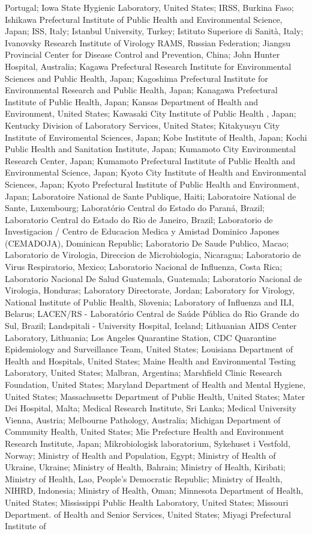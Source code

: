 Portugal; Iowa State Hygienic Laboratory, United States; IRSS, Burkina Faso; Ishikawa Prefectural Institute of Public Health and Environmental Science, Japan; ISS, Italy; Istanbul University, Turkey; Istituto Superiore di Sanità, Italy; Ivanovsky Research Institute of Virology RAMS, Russian Federation; Jiangsu Provincial Center for Disease Control and Prevention, China; John Hunter Hospital, Australia; Kagawa Prefectural Research Institute for Environmental Sciences and Public Health, Japan; Kagoshima Prefectural Institute for Environmental Research and Public Health, Japan; Kanagawa Prefectural Institute of Public Health, Japan; Kansas Department of Health and Environment, United States; Kawasaki City Institute of Public Health , Japan; Kentucky Division of Laboratory Services, United States; Kitakyusyu City Institute of Enviromental Sciences, Japan; Kobe Institute of Health, Japan; Kochi Public Health and Sanitation Institute, Japan; Kumamoto City Environmental Research Center, Japan; Kumamoto Prefectural Institute of Public Health and Environmental Science, Japan; Kyoto City Institute of Health and Environmental Sciences, Japan; Kyoto Prefectural Institute of Public Health and Environment, Japan; Laboratoire National de Sante Publique, Haiti; Laboratoire National de Sante, Luxembourg; Laboratório Central do Estado do Paraná, Brazil; Laboratorio Central do Estado do Rio de Janeiro, Brazil; Laboratorio de Investigacion / Centro de Educacion Medica y Amistad Dominico Japones (CEMADOJA), Dominican Republic; Laboratorio De Saude Publico, Macao; Laboratorio de Virologia, Direccion de Microbiologia, Nicaragua; Laboratorio de Virus Respiratorio, Mexico; Laboratorio Nacional de Influenza, Costa Rica; Laboratorio Nacional De Salud Guatemala, Guatemala; Laboratorio Nacional de Virologia, Honduras; Laboratory Directorate, Jordan; Laboratory for Virology, National Institute of Public Health, Slovenia; Laboratory of Influenza and ILI, Belarus; LACEN/RS - Laboratório Central de Saúde Pública do Rio Grande do Sul, Brazil; Landspitali - University Hospital, Iceland; Lithuanian AIDS Center Laboratory, Lithuania; Los Angeles Quarantine Station, CDC Quarantine Epidemiology and Surveillance Team, United States; Louisiana Department of Health and Hospitals, United States; Maine Health and Environmental Testing Laboratory, United States; Malbran, Argentina; Marshfield Clinic Research Foundation, United States; Maryland Department of Health and Mental Hygiene, United States; Massachusetts Department of Public Health, United States; Mater Dei Hospital, Malta; Medical Research Institute, Sri Lanka; Medical University Vienna, Austria; Melbourne Pathology, Australia; Michigan Department of Community Health, United States; Mie Prefecture Health and Environment Research Institute, Japan; Mikrobiologisk laboratorium, Sykehuset i Vestfold, Norway; Ministry of Health and Population, Egypt; Ministry of Health of Ukraine, Ukraine; Ministry of Health, Bahrain; Ministry of Health, Kiribati; Ministry of Health, Lao, People's Democratic Republic; Ministry of Health, NIHRD, Indonesia; Ministry of Health, Oman; Minnesota Department of Health, United States; Mississippi Public Health Laboratory, United States; Missouri Department. of Health and Senior Services, United States; Miyagi Prefectural Institute of 